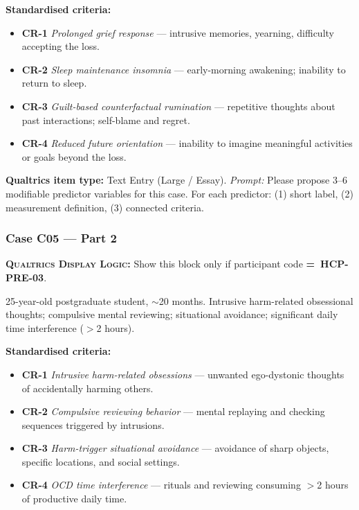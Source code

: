 \documentclass[11pt,a4paper]{article}
\newcommand{\responsetextarea}[1]{\begin{tcolorbox}[colback=ResponseBG,colframe=GoldAmber,boxrule=0.6pt,arc=1.5mm,left=6pt,right=6pt,top=5pt,bottom=5pt]\small\textbf{\color{GoldAmber}Qualtrics item type:} Text Entry (Large / Essay). \quad \textit{Prompt:} #1\end{tcolorbox}}
\newcommand{\dlnote}[1]{\par\vspace{0.15em}\noindent\begin{tcolorbox}[colback=AccentAmber,colframe=GoldAmber,boxrule=0.45pt,arc=1mm,left=5pt,right=5pt,top=2.5pt,bottom=2.5pt]\footnotesize\textbf{\color{GoldAmber}\scshape Qualtrics Display Logic:} Show this block only if participant code \textbf{=~#1}.\end{tcolorbox}\vspace{0.1em}}
\begin{document}
\begin{contextbox}
\small\textbf{Standardised criteria:}
\begin{itemize}[topsep=2pt,itemsep=1pt]
\item \textbf{CR-1} \textit{Prolonged grief response} --- intrusive memories, yearning, difficulty accepting the loss.
\item \textbf{CR-2} \textit{Sleep maintenance insomnia} --- early-morning awakening; inability to return to sleep.
\item \textbf{CR-3} \textit{Guilt-based counterfactual rumination} --- repetitive thoughts about past interactions; self-blame and regret.
\item \textbf{CR-4} \textit{Reduced future orientation} --- inability to imagine meaningful activities or goals beyond the loss.
\end{itemize}
\end{contextbox}

\responsetextarea{Please propose 3--6 modifiable predictor variables for this case. For each predictor: (1) short label, (2) measurement definition, (3) connected criteria.}

\vspace{0.4em}

\subsubsection*{Case C05 --- Part 2}
\dlnote{HCP-PRE-03}

\begin{complaintbox}[title=Case C05 --- Complaint (abbreviated)]
\small 25-year-old postgraduate student, $\sim$20 months. Intrusive harm-related obsessional thoughts; compulsive mental reviewing; situational avoidance; significant daily time interference ($>$2 hours).
\end{complaintbox}

\begin{contextbox}
\small\textbf{Standardised criteria:}
\begin{itemize}[topsep=2pt,itemsep=1pt]
\item \textbf{CR-1} \textit{Intrusive harm-related obsessions} --- unwanted ego-dystonic thoughts of accidentally harming others.
\item \textbf{CR-2} \textit{Compulsive reviewing behavior} --- mental replaying and checking sequences triggered by intrusions.
\item \textbf{CR-3} \textit{Harm-trigger situational avoidance} --- avoidance of sharp objects, specific locations, and social settings.
\item \textbf{CR-4} \textit{OCD time interference} --- rituals and reviewing consuming $>$2 hours of productive daily time.
\end{itemize}
\end{contextbox}
\end{document}
